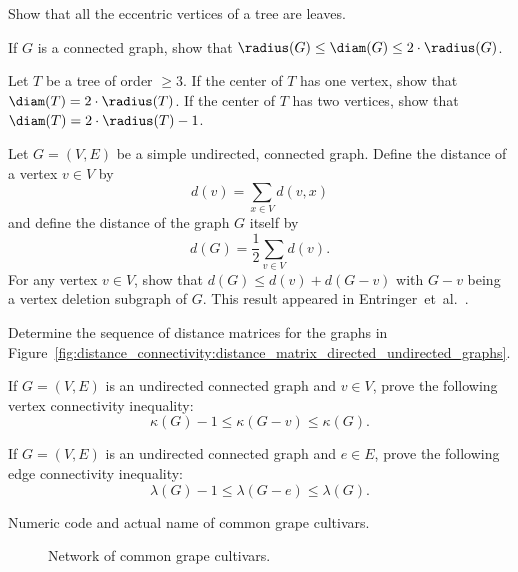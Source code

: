 \begin{problem}
\item\label{prob:distance_connectivity:eccentric_vertices_laves} Show
  that all the eccentric vertices of a tree are leaves.

\item If $G$ is a connected graph, show that
  $\radius(G) \leq \diam(G) \leq 2 \cdot \radius(G)$.

\item Let $T$ be a tree of order $\geq 3$. If the center of $T$ has
  one vertex, show that $\diam(T) = 2 \cdot \radius(T)$. If the center
  of $T$ has two vertices, show that
  $\diam(T) = 2 \cdot \radius(T) - 1$.

\item Let $G = (V,E)$ be a simple undirected, connected graph. Define
  the distance of a vertex $v \in V$ by
  \[
  d(v)
  =
  \sum_{x \in V} d(v,x)
  \]
  and define the distance of the graph $G$ itself by
  \[
  d(G)
  =
  \frac{1}{2} \sum_{v \in V} d(v).
  \]
  For any vertex $v \in V$, show that
  $d(G) \leq d(v) + d(G - v)$ with $G - v$ being a vertex deletion
  subgraph of $G$. This result appeared in
  Entringer~et~al.~\cite[p.284]{EntringerEtAl1976}.

\item Determine the sequence of distance matrices for the graphs in
  Figure~\ref{fig:distance_connectivity:distance_matrix_directed_undirected_graphs}.

\item If $G = (V,E)$ is an undirected connected graph and $v \in V$,
  prove the following vertex connectivity inequality:
  \[
  \kappa(G) - 1
  \leq
  \kappa(G - v)
  \leq
  \kappa(G).
  \]

\item If $G = (V,E)$ is an undirected connected graph and $e \in E$,
  prove the following edge connectivity inequality:
  \[
  \lambda(G) - 1
  \leq
  \lambda(G - e)
  \leq
  \lambda(G).
  \]

\begin{table}[!htbp]
\centering
{}

\caption{Numeric code and actual name of common grape cultivars.}
\label{tab:distance_connectivity:wine_network}
\end{table}

\begin{figure}[!htbp]
\centering
{}

\caption{Network of common grape cultivars.}
\label{fig:distance_connectivity:wine_network}
\end{figure}


\end{problem}

